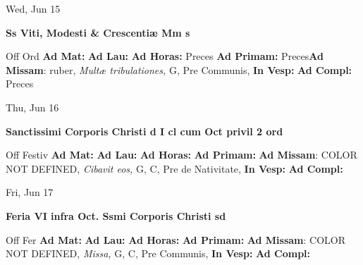 \documentclass[10pt]{memoir}
\begin{document}
\begin{center}
\begin{minipage}{3.5in}
\vspace{2em}
\begin{center}Wed, Jun 15
\end{center}
\textbf{ \large Ss Viti, Modesti \& Crescentiæ Mm
\textnormal{\normalsize s}}

\begin{justify}Off Ord
\textbf{Ad Mat: }
\textbf{Ad Lau: }
\textbf{Ad Horas: }Preces
\textbf{Ad Primam: }Preces\textbf{Ad Missam}: ruber, \textit{Multæ tribulationes,} G, Pre Communis, 
\textbf{In Vesp: }
\textbf{Ad Compl: }Preces
\end{justify}
\end{minipage}
\end{center}

\begin{center}
\begin{minipage}{3.5in}
\vspace{2em}
\begin{center}Thu, Jun 16
\end{center}
\textbf{ \large Sanctissimi Corporis Christi
\textnormal{\normalsize d I cl cum Oct privil 2 ord}}

\begin{justify}Off Festiv
\textbf{Ad Mat: }
\textbf{Ad Lau: }
\textbf{Ad Horas: }
\textbf{Ad Primam: }\textbf{Ad Missam}: COLOR NOT DEFINED, \textit{Cibavit eos,} G, C, Pre de Nativitate, 
\textbf{In Vesp: }
\textbf{Ad Compl: }
\end{justify}
\end{minipage}
\end{center}

\begin{center}
\begin{minipage}{3.5in}
\vspace{2em}
\begin{center}Fri, Jun 17
\end{center}
\textbf{ \large Feria VI infra Oct. Ssmi Corporis Christi
\textnormal{\normalsize sd}}

\begin{justify}Off Fer
\textbf{Ad Mat: }
\textbf{Ad Lau: }
\textbf{Ad Horas: }
\textbf{Ad Primam: }\textbf{Ad Missam}: COLOR NOT DEFINED, \textit{Missa,} G, C, Pre Communis, 
\textbf{In Vesp: }
\textbf{Ad Compl: }
\end{justify}
\end{minipage}
\end{center}
\end{document}
